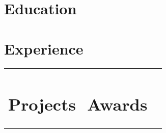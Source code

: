 \documentclass{cv}
\begin{document}

    \section{Education}
        

    \section{Experience}
        
        

    \hspace*{-0.9cm}
    \begin{tabular}{p{0.488\linewidth}p{0.488\linewidth}}
        \section{Projects}
            
            
            
        
        &

        \section{Awards}
            
            
            
    \end{tabular}
\end{document}
